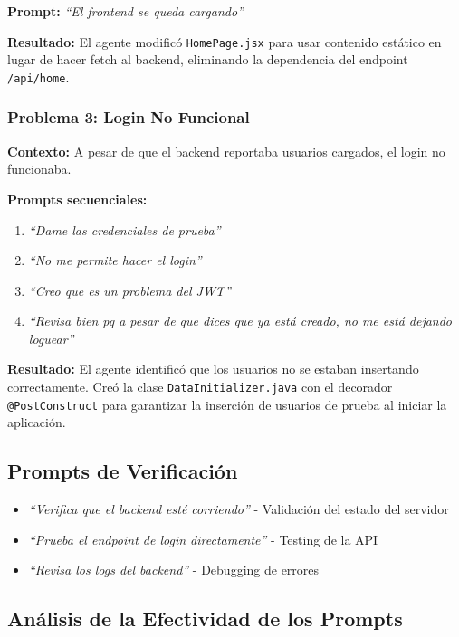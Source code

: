 \documentclass[11pt,a4paper]{article}
\begin{document}
\textbf{Prompt:} \textit{``El frontend se queda cargando''}

\textbf{Resultado:} El agente modificó \texttt{HomePage.jsx} para usar contenido estático en lugar de hacer fetch al backend, eliminando la dependencia del endpoint \texttt{/api/home}.

\subsubsection{Problema 3: Login No Funcional}

\textbf{Contexto:} A pesar de que el backend reportaba usuarios cargados, el login no funcionaba.

\textbf{Prompts secuenciales:}
\begin{enumerate}
    \item \textit{``Dame las credenciales de prueba''}
    \item \textit{``No me permite hacer el login''}
    \item \textit{``Creo que es un problema del JWT''}
    \item \textit{``Revisa bien pq a pesar de que dices que ya está creado, no me está dejando loguear''}
\end{enumerate}

\textbf{Resultado:} El agente identificó que los usuarios no se estaban insertando correctamente. Creó la clase \texttt{DataInitializer.java} con el decorador \texttt{@PostConstruct} para garantizar la inserción de usuarios de prueba al iniciar la aplicación.

\subsection{Prompts de Verificación}

\begin{itemize}
    \item \textit{``Verifica que el backend esté corriendo''} - Validación del estado del servidor
    \item \textit{``Prueba el endpoint de login directamente''} - Testing de la API
    \item \textit{``Revisa los logs del backend''} - Debugging de errores
\end{itemize}

\subsection{Análisis de la Efectividad de los Prompts}
\end{document}
